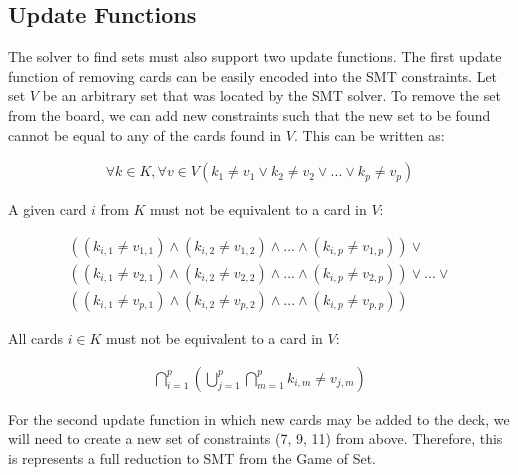 \documentclass[pageno]{jpaper}
\begin{document}
\subsection{Update Functions} 
The solver to find sets must also support two update functions. The first update function of removing cards can be easily encoded into the SMT constraints. Let set $V$ be an arbitrary set that was located by the SMT solver. To remove the set from the board, we can add new constraints such that the new set to be found cannot be equal to any of the cards found in $V$. This can be written as:

\begin{align}
	\forall k \in K, \forall v \in V \left (k_1 \neq v_1 \vee k_2 \neq v_2 \vee ... \vee k_p \neq v_p \right)
\end{align}

A given card $i$ from $K$ must not be equivalent to a card in $V$:

\begin{multline}
	((k_{i,1} \neq v_{1,1}) \wedge (k_{i,2} \neq v_{1,2}) \wedge ... \wedge (k_{i,p} \neq v_{1,p})) \vee \\
	 ((k_{i,1} \neq v_{2,1}) \wedge (k_{i,2} \neq v_{2,2}) \wedge ... \wedge (k_{i,p} \neq v_{2,p}))  \vee ... \vee \\ ((k_{i,1} \neq v_{p,1}) \wedge (k_{i,2} \neq v_{p,2}) \wedge ... \wedge (k_{i,p} \neq v_{p,p})) 
\end{multline}

All cards $i \in K$ must not be equivalent to a card in $V$:

\begin{align}
	\bigcap \limits_{i=1}^{p}   \left( \bigcup \limits_{j=1}^{p}  \bigcap \limits_{m = 1}^{p} k_{i,m} \neq v_{j,m} \right)   
\end{align}

For the second update function in which new cards may be added to the deck, we will need to create a new set of constraints (7, 9, 11) from above. Therefore, this is represents a full reduction to SMT from the Game of Set. 
\end{document}
